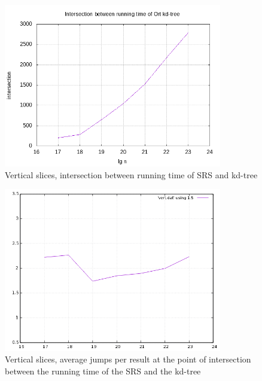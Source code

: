 \begin{figure}[h]
    \centering
    \includegraphics[width = 0.85\textwidth]{pictures/analysis/vert.png}
    \caption{Vertical slices, intersection between running time of SRS and kd-tree}\label{fig:vert_intersection}
\end{figure}


\begin{figure}[h]
    \centering
    \includegraphics[width = 0.85\textwidth]{pictures/analysis/vert_jumps_per_lgn.png}
    \caption{Vertical slices, average jumps per result at the point of intersection between the running time of the SRS and the kd-tree}\label{fig:vert_jumps_per_lgn}
\end{figure}


